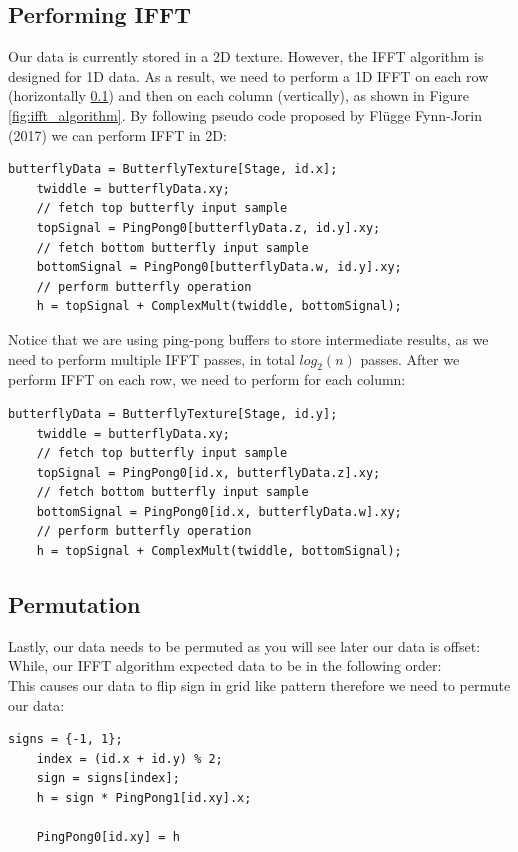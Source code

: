 \subsection{Performing IFFT}
Our data is currently stored in a 2D texture. However, the IFFT algorithm is designed for 1D data. As a result, we need to perform a 1D IFFT on each row (horizontally \ref{}) and then on each column (vertically), as shown in Figure \ref{fig:ifft_algorithm}.
By following pseudo code proposed by Fl{\"u}gge Fynn-Jorin (2017) \cite{flugge2017} we can perform IFFT in 2D:

\begin{lstlisting}[caption={Horizontal Butterfly Operation}, frame=single, numberstyle=\small\color{gray}, captionpos=b]
    butterflyData = ButterflyTexture[Stage, id.x];
    twiddle = butterflyData.xy;
    // fetch top butterfly input sample
    topSignal = PingPong0[butterflyData.z, id.y].xy;
    // fetch bottom butterfly input sample
    bottomSignal = PingPong0[butterflyData.w, id.y].xy;
    // perform butterfly operation
    h = topSignal + ComplexMult(twiddle, bottomSignal);
\end{lstlisting}

Notice that we are using ping-pong buffers to store intermediate results, as we need to perform multiple IFFT passes, in total $log_2(n)$ passes.
After we perform IFFT on each row, we need to perform for each column:
\begin{lstlisting}[caption={Vertical Butterfly Operation}, frame=single, numberstyle=\small\color{gray}, captionpos=b]
    butterflyData = ButterflyTexture[Stage, id.y];
    twiddle = butterflyData.xy;
    // fetch top butterfly input sample
    topSignal = PingPong0[id.x, butterflyData.z].xy;
    // fetch bottom butterfly input sample
    bottomSignal = PingPong0[id.x, butterflyData.w].xy;
    // perform butterfly operation
    h = topSignal + ComplexMult(twiddle, bottomSignal);
\end{lstlisting}

\subsection*{Permutation}
Lastly, our data needs to be permuted as you will see later our data is offset:
\begin{equation}
    [\text{freq} (-N / 2), \text{ ...}, \text{ freq} (-1), \text{ freq} (0), \text{ freq} (1), \text{ ...}, \text{ freq} (N / 2 - 1)]
\end{equation}
While, our IFFT algorithm expected data to be in the following order:
\begin{equation}
    [\text{freq} (0), \text{ freq} (1), \text{ ...}, \text{ freq}(N - 1)]
\end{equation}
This causes our data to flip sign in grid like pattern therefore we need to permute our data:
\begin{lstlisting}[caption={Data Permutation \cite{flugge2017} }, frame=single, numberstyle=\small\color{gray}, captionpos=b]
    signs = {-1, 1};
    index = (id.x + id.y) % 2;
    sign = signs[index];
    h = sign * PingPong1[id.xy].x;
    
    PingPong0[id.xy] = h
\end{lstlisting}

